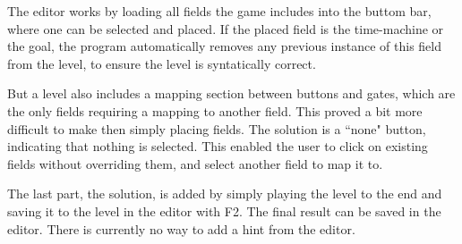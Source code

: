 The editor works by loading all fields the game includes into the buttom
bar, where one can be selected and placed. If the placed field is the
time-machine or the goal, the program automatically removes any
previous instance of this field from the level, to ensure the level is
syntatically correct.

But a level also includes a mapping section between buttons and gates,
which are the only fields requiring a mapping to another field. This proved
a bit more difficult to make then simply placing fields. The solution is a
``none" button, indicating that nothing is selected. This enabled the
user to click on existing fields without overriding them, and select another
field to map it to.

The last part, the solution, is added by simply playing the level to the end
and saving it to the level in the editor with F2. The final result can be saved
in the editor. There is currently no way to add a hint from the editor.


